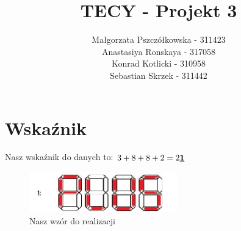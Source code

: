 \documentclass[]{article}
\title{TECY - Projekt 3}
\author{Małgorzata Pszczółkowska - 311423\\ Anastasiya Ronskaya - 317058 \\ Konrad Kotlicki - 310958 \\Sebastian Skrzek - 311442}
\begin{document}
\maketitle
\tableofcontents
\section{Wskaźnik}
Nasz wskaźnik do danych to:
$3+8+8+2=2\textbf{\underline{1}}$
\begin{figure}[H]
	\centering
	\includegraphics[width=0.57\textwidth]{plus.png}
	\caption{Nasz wzór do realizacji}
\end{figure}
\end{document}
